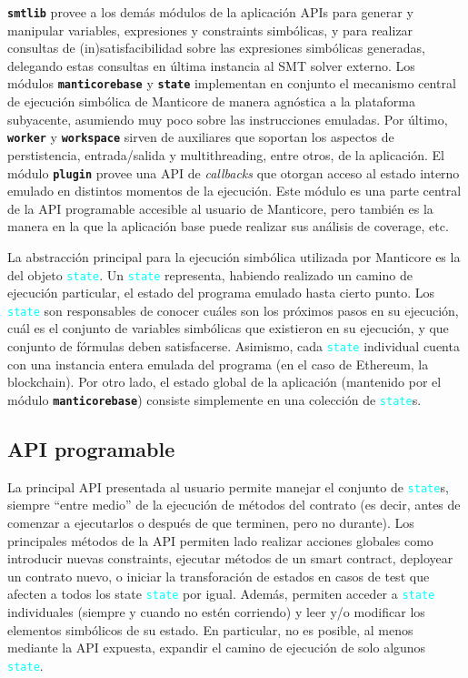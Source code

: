 \texttt{\textbf{smtlib}} provee a los demás módulos de la aplicación APIs para generar y manipular variables, expresiones y constraints simbólicas, y para realizar consultas de (in)satisfacibilidad sobre las expresiones simbólicas generadas, delegando estas consultas en última instancia al SMT solver externo.
Los módulos \texttt{\textbf{manticorebase}} y \texttt{\textbf{state}} implementan en conjunto el mecanismo central de ejecución simbólica de Manticore de manera agnóstica a la plataforma subyacente, asumiendo muy poco sobre las instrucciones emuladas.
Por último, \texttt{\textbf{worker}} y \texttt{\textbf{workspace}} sirven de auxiliares que soportan los aspectos de perstistencia, entrada/salida y multithreading, entre otros, de la aplicación.
El módulo \texttt{\textbf{plugin}} provee una API de \textit{callbacks} que otorgan acceso al estado interno emulado en distintos momentos de la ejecución.
Este módulo es una parte central de la API programable accesible al usuario de Manticore, pero también es la manera en la que la aplicación base puede realizar sus análisis de coverage, etc.

La abstracción principal para la ejecución simbólica utilizada por Manticore es la del objeto \textcolor{cyan}{\texttt{state}}.
Un \textcolor{cyan}{\texttt{state}} representa, habiendo realizado un camino de ejecución particular, el estado del programa emulado hasta cierto punto.
Los \textcolor{cyan}{\texttt{state}} son responsables de conocer cuáles son los próximos pasos en su ejecución, cuál es el conjunto de variables simbólicas que existieron en su ejecución, y que conjunto de fórmulas deben satisfacerse.
Asimismo, cada \textcolor{cyan}{\texttt{state}} individual cuenta con una instancia entera emulada del programa (en el caso de Ethereum, la blockchain).
Por otro lado, el estado global de la aplicación (mantenido por el módulo \texttt{\textbf{manticorebase}}) consiste simplemente en una colección de \textcolor{cyan}{\texttt{state}}s.

\subsection{API programable}
La principal API presentada al usuario permite manejar el conjunto de  \textcolor{cyan}{\texttt{state}}s, siempre ``entre medio'' de la ejecución de métodos del contrato (es decir, antes de comenzar a ejecutarlos o después de que terminen, pero no durante).
Los principales métodos de la API permiten lado realizar acciones globales como introducir nuevas constraints, ejecutar métodos de un smart contract, deployear un contrato nuevo, o iniciar la transforación de estados en casos de test que afecten a todos los state \textcolor{cyan}{\texttt{state}} por igual.
Además, permiten acceder a \textcolor{cyan}{\texttt{state}} individuales (siempre y cuando no estén corriendo) y leer y/o modificar los elementos simbólicos de su estado.
En particular, no es posible, al menos mediante la API expuesta, expandir el camino de ejecución de solo algunos \textcolor{cyan}{\texttt{state}}.

